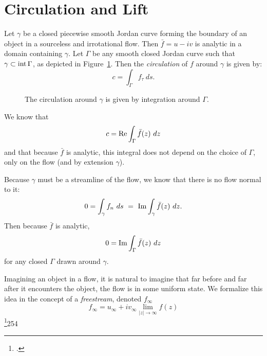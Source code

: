 \documentclass[letterpaper, twoside, 12 pt]{article}
\begin{document}
\section{Circulation and Lift} %
\label{sec:circulation_and_lift}

	\begin{definition}[Circulation]
		Let $\gamma$ be a closed piecewise smooth Jordan curve forming the boundary of an object in a sourceless and irrotational flow. 
		Then $\bar f  = u - iv$ is analytic in a domain containing $\gamma$.
		Let $\Gamma$ be any smooth closed Jordan curve such that $\gamma \subset \intr \Gamma$, as depicted in Figure~\ref{fig:circulation}.
		Then the \textit{circulation} of $f$ around $\gamma$ is given by:
		\[
			c = \int_\Gamma f_\tau \ ds.
		\]
	\end{definition}
	\begin{figure}[H]
		\centering
		\begin{tikzpicture}
			
		\end{tikzpicture}
		\captionsetup{width = 0.5 \textwidth}
		\caption{
			The circulation around $\gamma$ is given by integration around $\Gamma$.
		}
		\label{fig:circulation}
	\end{figure}

	\begin{remark}
		We know that 
		\[
			c = \re \int_\Gamma \bar f(z) \ dz
		\]
		and that because $\bar f$ is analytic, this integral does not depend on the choice of $\Gamma$, only on the flow (and by extension $\gamma$).

		Because $\gamma$ must be a streamline of the flow, we know that there is no flow normal to it:
		\[
			0 = \int_\gamma f_n \ ds \ = \ \im \int_\gamma \bar f(z) \ dz.
		\]
		Then because $\bar f$ is analytic, 
		\[
			0 = \im \int_\Gamma \bar f (z)\ dz
		\]
		for any closed $\Gamma$ drawn around $\gamma$.
	\end{remark}

	\begin{definition}[Freestream]
		Imagining an object in a flow, it is natural to imagine that far before and far after it encounters the object, the flow is in some uniform state.
		We formalize this idea in the concept of a \textit{freestream}, denoted $f_\infty$
		\[
			f_\infty = u_\infty + i v_\infty \lim_{|z| \to \infty} f(z)
		\]
		\footcite{fisher}{254}
	\end{definition}
\end{document}
